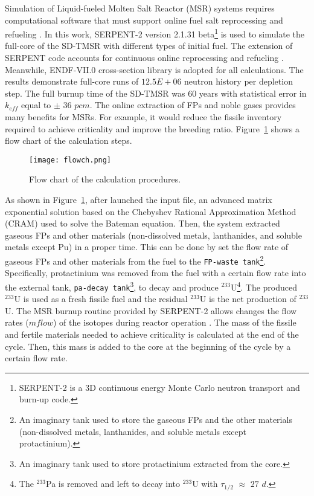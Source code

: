 Simulation of Liquid-fueled Molten Salt Reactor (MSR) systems requires computational software that must support online fuel salt reprocessing and refueling \cite{serp2014molten}. In this work, SERPENT-2 version 2.1.31 beta\footnote{SERPENT-2 is a \gls{3D} continuous energy Monte Carlo neutron transport and burn-up code.} \cite{leppanen2014serpent} is used to simulate the full-core of the SD-TMSR with different types of initial fuel. The extension of SERPENT code accounts for continuous online reprocessing and refueling \cite{aufiero2013extended}. Meanwhile, ENDF-VII.0 cross-section library is adopted for all calculations. The results demonstrate full-core runs of $12.5E+06$ neutron history per depletion step. The full burnup time of the SD-TMSR was 60 years with statistical error in $k_{eff}$ equal to $\pm$ $36$ $pcm$. The online extraction of \gls{FPs} and noble gases  provides many benefits for MSRs. For example, it would reduce the fissile inventory required to achieve criticality and improve the breeding ratio.
Figure~\ref{fig:flow} shows a flow chart of the calculation steps. 

\begin{figure}[t!] %
	\texttt{[image: flowch.png]}
	\caption{Flow chart of the calculation procedures.}
	\label{fig:flow}
\end{figure}

As shown in Figure~\ref{fig:flow}, after launched the input file, an advanced matrix exponential solution based on the Chebyshev Rational Approximation Method (CRAM) \cite{isotalo2016improving} used to solve the Bateman equation. Then, the system extracted gaseous \gls{FPs} and other materials (non-dissolved metals, lanthanides, and soluble metals except Pu) in a proper time. This can be done by set the flow rate of gaseous \gls{FPs} and other materials from the fuel to the \texttt{FP-waste tank}\footnote{An imaginary tank used to store the gaseous \gls{FPs} and the other materials (non-dissolved metals, lanthanides, and soluble metals except protactinium).}. Specifically, protactinium was removed from the fuel with a certain flow rate into the external tank, \texttt{pa-decay tank}\footnote{An imaginary tank used to store protactinium extracted from the core.}, to decay and produce $^{233}$U\footnote{The $^{233}$Pa is removed and left to decay into $^{233}$U with $\tau_{1/2}$ $\approx$ $27$ $d$.}. The produced $^{233}$U is used as a fresh fissile fuel and the residual $^{233}$U is the net production of $^{233}$U. The MSR burnup routine provided by SERPENT-2 allows changes the flow rates ($mflow$) of the isotopes during reactor operation \cite{aufiero2013extended}. The mass of the fissile and fertile materials needed to achieve criticality is calculated at the end of the cycle. Then, this mass is added to the core at the beginning of the cycle by a certain flow rate.

